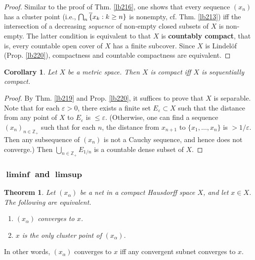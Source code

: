 \documentclass[12pt,b5paper,notitlepage]{article}
\theoremstyle{definition}
\theoremstyle{plain}
\newtheorem{thm}[df]{Theorem}
\newtheorem{co}[df]{Corollary}
\newcommand{\ovl}{\overline}
\newcommand{\Zbb}{\mathbb Z}
\newcommand{\eps}{\varepsilon}
\numberwithin{equation}{section}
\begin{document}
\begin{proof}
Similar to the proof of Thm. \ref{lb216}, one shows that every sequence $(x_n)$ has a cluster point (i.e., $\bigcap_n\ovl\{x_k:k\geq n\}$ is nonempty, cf. Thm. \ref{lb213}) iff the intersection of a decreasing \textit{sequence} of non-empty closed subsets of $X$ is non-empty. The latter condition is equivalent to that $X$ is \textbf{countably compact}, that is, every countable open cover of $X$ has a finite subcover. Since $X$ is Lindel\"of (Prop. \ref{lb220}), compactness and countable compactness are equivalent.
\end{proof}



\begin{co}\label{lb354}
Let $X$ be a metric space. Then $X$ is compact iff $X$ is sequentially compact.
\end{co}

\begin{proof}
By Thm. \ref{lb219} and Prop. \ref{lb220}, it suffices to prove that $X$ is separable. Note that for each $\eps>0$, there exists a finite set $E_\eps\subset X$ such that the distance from any point of $X$ to $E_\eps$ is $\leq \eps$. (Otherwise, one can find a sequence $(x_n)_{n\in\Zbb_+}$ such that for each $n$, the distance from $x_{n+1}$ to $\{x_1,\dots,x_n\}$ is $>1/\eps$. Then any subsequence of $(x_n)$ is not a Cauchy sequence, and hence does not converge.) Then $\bigcup_{n\in\Zbb_+}E_{1/n}$ is a countable dense subset of $X$.
\end{proof}




\subsubsection{$\pmb\liminf$ and $\pmb\limsup$}



\begin{thm}\label{lb227}
Let $(x_\alpha)$ be a net in a compact Hausdorff space $X$, and let $x\in X$. The following are equivalent.
\begin{enumerate}
\item[(1)] $(x_\alpha)$ converges to $x$.
\item[(2)] $x$ is the only cluster point of $(x_\alpha)$.
\end{enumerate}
\end{thm}

In other words, $(x_\alpha)$ converges to $x$ iff any convergent subnet converges to $x$.
\end{document}

